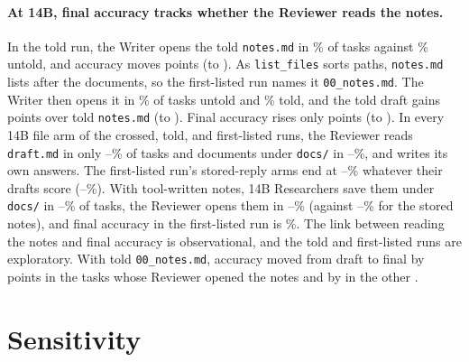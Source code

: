 \documentclass[sigplan,10pt,nonacm,review,anonymous]{acmart}
\begin{document}
\paragraph{At 14B, final accuracy tracks whether the Reviewer reads the notes.} In the told run, the
Writer opens the told \texttt{notes.md} in \nRToldFourteenOpenTold{}\% of tasks against
\nRToldFourteenOpenUntold{}\% untold, and accuracy moves \nRToldFourteenToldOverUntold points
(\nRToldFourteenToldOverUntoldLo to \nRToldFourteenToldOverUntoldHi). As \texttt{list\_files} sorts paths,
\texttt{notes.md} lists after the documents, so the first-listed run names it \texttt{00\_notes.md}. The
Writer then opens it in \nRFirstOpenFirstUntold{}\% of tasks untold and \nRFirstOpenFirstTold{}\% told, and
the told draft gains \nRFirstDraftFirstToldOverTold points over told \texttt{notes.md}
(\nRFirstDraftFirstToldOverToldLo to \nRFirstDraftFirstToldOverToldHi). Final accuracy rises only
\nRFirstAccFirstToldOverTold points (\nRFirstAccFirstToldOverToldLo to \nRFirstAccFirstToldOverToldHi). In
every 14B file arm of the crossed, told, and first-listed runs, the Reviewer reads \texttt{draft.md} in only
\nRFourteenRevDraftFourteenMin--\nRFourteenRevDraftFourteenMax{}\% of tasks and documents under \texttt{docs/}
in \nRFourteenRevDocsMin--\nRFourteenRevDocsMax{}\%, and writes its own answers. The
first-listed run's stored-reply arms end at \nRFirstStoredFinalMin--\nRFirstStoredFinalMax{}\% whatever their
drafts score (\nRFirstStoredDraftMin--\nRFirstStoredDraftMax{}\%). With tool-written notes, 14B Researchers
save them under \texttt{docs/} in \nRFourteenNotesUnderDocsMin--\nRFourteenNotesUnderDocsMax{}\% of tasks,
the Reviewer opens them in \nRFourteenRevNotesToolMin--\nRFourteenRevNotesToolMax{}\% (against
\nRFourteenRevNotesStoredMin--\nRFourteenRevNotesStoredMax{}\% for the stored notes), and final accuracy in
the first-listed run is \nRFirstAccTool{}\%. The link between reading the notes and final accuracy is observational, and the told and
first-listed runs are exploratory. With told \texttt{00\_notes.md}, accuracy moved from draft
to final by \nRFirstReviseFirstToldOpened points in the \nRFirstReviseFirstToldOpenedN tasks whose Reviewer
opened the notes and by \nRFirstReviseFirstToldSkipped in the other \nRFirstReviseFirstToldSkippedN.

\section{Sensitivity}
\label{sec:sensitivity}
\end{document}
